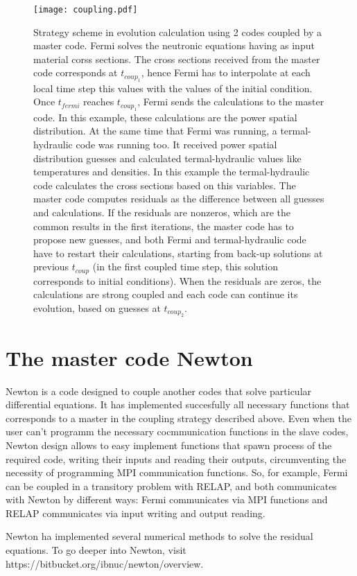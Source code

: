 \begin{figure}['ht]
\centering{}\texttt{[image: coupling.pdf]}
\caption{Strategy scheme in evolution calculation using 2 codes coupled by a master code.
Fermi solves the neutronic equations having as input material corss sections.
The cross sections received from the master code corresponds at $t_{coup_1}$,
hence Fermi has to interpolate at each local time step this values with the values of the initial condition.
Once $t_{fermi}$ reaches $t_{coup_1}$, Fermi sends the calculations to the master code.
In this example, these calculations are the power spatial distribution.
At the same time that Fermi was running, a termal-hydraulic code was running too.
It received power spatial distribution guesses and calculated termal-hydraulic values like temperatures and densities.
In this example the termal-hydraulic code calculates the cross sections based on this variables.
The master code computes residuals as the difference between all guesses and calculations.
If the residuals are nonzeros, which are the common results in the first iterations, the master code has to propose new guesses,
and both Fermi and termal-hydraulic code have to restart their calculations, starting from back-up solutions at previous $t_{coup}$
(in the first coupled time step, this solution corresponds to initial conditions).
When the residuals are zeros, the calculations are strong coupled and each code can continue its evolution, based on guesses at $t_{coup_2}$.
}
\label{couplingScheme} 
\end{figure}

\section{The master code Newton}
Newton is a code designed to couple another codes that solve particular differential equations.
It has implemented succesfully all necessary functions that corresponds to a master in the coupling strategy described above.
Even when the user can't programm the necessary cocmmunication functions in the slave codes, 
Newton design allows to easy implement functions that spawn process of the required code,
writing their inputs and reading their outputs,
circumventing the necessity of programming MPI communication functions.
So, for example, Fermi can be coupled in a transitory problem with RELAP,
and both communicates with Newton by different ways:
Fermi communicates via MPI functions and RELAP communicates via input writing and output reading.

Newton ha implemented several numerical methods to solve the residual equations.
To go deeper into Newton, visit https://bitbucket.org/ibnuc/newton/overview.

